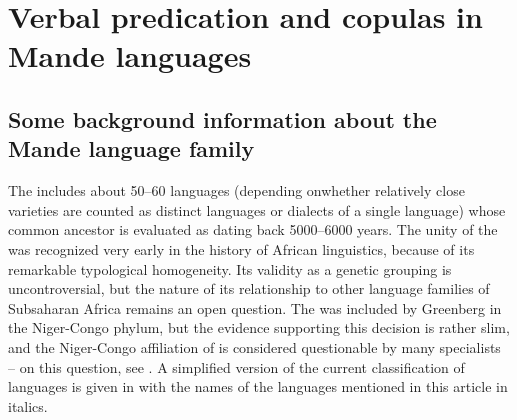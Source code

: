 \documentclass[output=paper]{langsci/langscibook}
\begin{document}
\section{Verbal predication and copulas in Mande languages}\label{sec:creissels:3}

\subsection{Some background information about the Mande language family}\label{sec:creissels:3.1}

The   includes about 50--60 languages (depending on\linebreak whether relatively close varieties are counted as distinct languages or dialects of a single language) whose common ancestor is evaluated as dating back 5000--6000 years. The unity of the   was recognized very early in the history of African linguistics, because of its remarkable typological homogeneity. Its validity as a genetic grouping is uncontroversial, but the nature of its relationship to other language families of Subsaharan Africa remains an open question. The   was included by Greenberg in the Niger-Congo phylum, but the evidence supporting this decision is rather slim, and the Niger-Congo affiliation of  is considered questionable by many specialists – on this question, see \citet{Dimmendaal2011}. A simplified version of the current classification of  languages is given in  with the names of the languages mentioned in this article in italics.
\end{document}
